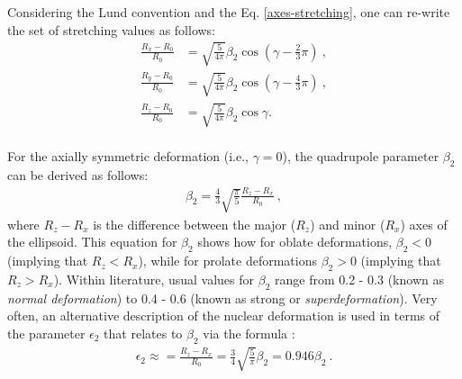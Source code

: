 Considering the Lund convention and the Eq. \ref{axes-stretching}, one can re-write the set of stretching values as follows:
\begin{align}
    \frac{R_x-R_0}{R_0}&=\sqrt{\frac{5}{4\pi}}\beta_2\cos\left(\gamma-\frac{2}{3}\pi\right)\ , \\
    \frac{R_y-R_0}{R_0}&=\sqrt{\frac{5}{4\pi}}\beta_2\cos\left(\gamma-\frac{4}{3}\pi\right)\ , \\
    \frac{R_z-R_0}{R_0}&=\sqrt{\frac{5}{4\pi}}\beta_2\cos\gamma. \\
\end{align}

For the axially symmetric deformation (i.e., $\gamma=0$), the quadrupole parameter $\beta_2$ can be derived as follows:
\begin{align}
    \beta_2=\frac{4}{3}\sqrt{\frac{\pi}{5}}\frac{R_z-R_x}{R_0}\ ,
\end{align}
where $R_z-R_x$ is the difference between the major ($R_z$) and minor ($R_x$) axes of the ellipsoid. This equation for $\beta_2$ shows how for oblate deformations, $\beta_2<0$ (implying that $R_z<R_x$), while for prolate deformations $\beta_2>0$ (implying that $R_z>R_x$). Within literature, usual values for $\beta_2$ range from 0.2 - 0.3 (known as \emph{normal deformation}) to 0.4 - 0.6 (known as strong or \emph{superdeformation}). Very often, an alternative description of the nuclear deformation is used in terms of the parameter $\epsilon_2$ that relates to $\beta_2$ via the formula \cite{casten2000nuclear}:
\begin{align}
    \epsilon_2\approx=\frac{R_z-R_x}{R_0}=\frac{3}{4}\sqrt{\frac{5}{\pi}}\beta_2=0.946\beta_2\ .
    \label{epsilon-beta-relation}
\end{align}



